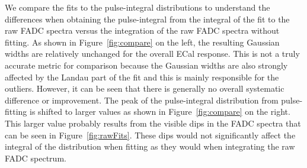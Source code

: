 \documentclass[twoside]{article}
\begin{document}
We compare the fits to the pulse-integral distributions to understand the differences when obtaining the pulse-integral from the integral of the fit to the raw FADC spectra versus the integration of the raw FADC spectra without fitting. As shown in Figure~\ref{fig:compare} on the left, the resulting Gaussian widths are relatively unchanged for the overall ECal response. This is not a truly accurate metric for comparison because the Gaussian widths are also strongly affected by the Landau part of the fit and this is mainly responsible for the outliers. However, it can be seen that there is generally no overall systematic difference or improvement. The peak of the pulse-integral distribution from pulse-fitting is shifted to larger values as shown in Figure~\ref{fig:compare} on the right. This larger value probably results from the visible dips in the FADC spectra that can be seen in Figure~\ref{fig:rawFits}. These dips would not significantly affect the integral of the distribution when fitting as they would when integrating the raw FADC spectrum.
\end{document}
